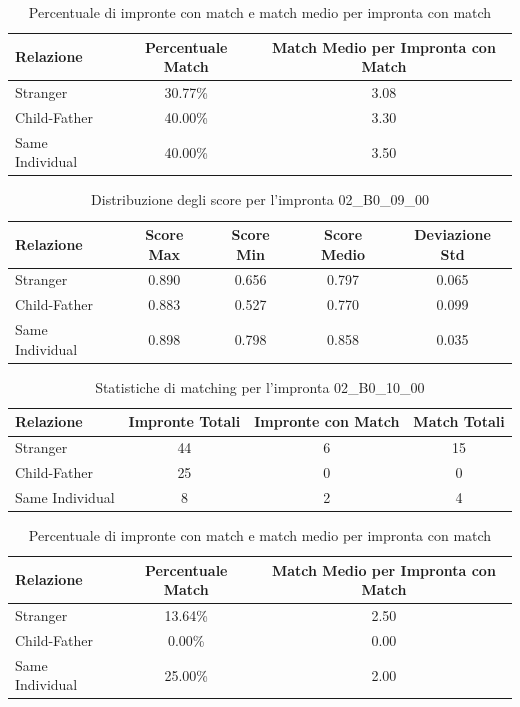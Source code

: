 \begin{table}[htbp]
\centering
\caption{Percentuale di impronte con match e match medio per impronta con match}
\label{tab:match_percentage_02_B0_09_00}
\begin{tabular}{|l|c|c|}
\hline
\textbf{Relazione} & \textbf{Percentuale Match} & \textbf{Match Medio per Impronta con Match} \\
\hline
Stranger & 30.77\% & 3.08 \\
\hline
Child-Father & 40.00\% & 3.30 \\
\hline
Same Individual & 40.00\% & 3.50 \\
\hline
\end{tabular}
\end{table}


\begin{table}[htbp]
\centering
\caption{Distribuzione degli score per l'impronta 02\_B0\_09\_00}
\label{tab:scores_02_B0_09_00}
\begin{tabular}{|l|c|c|c|c|}
\hline
\textbf{Relazione} & \textbf{Score Max} & \textbf{Score Min} & \textbf{Score Medio} & \textbf{Deviazione Std} \\
\hline
Stranger & 0.890 & 0.656 & 0.797 & 0.065 \\
\hline
Child-Father & 0.883 & 0.527 & 0.770 & 0.099 \\
\hline
Same Individual & 0.898 & 0.798 & 0.858 & 0.035 \\
\hline
\end{tabular}
\end{table}


\begin{table}[htbp]
\centering
\caption{Statistiche di matching per l'impronta 02\_B0\_10\_00}
\label{tab:results_02_B0_10_00}
\begin{tabular}{|l|c|c|c|}
\hline
\textbf{Relazione} & \textbf{Impronte Totali} & \textbf{Impronte con Match} & \textbf{Match Totali} \\
\hline
Stranger & 44 & 6 & 15 \\
\hline
Child-Father & 25 & 0 & 0 \\
\hline
Same Individual & 8 & 2 & 4 \\
\hline
\end{tabular}
\end{table}


\begin{table}[htbp]
\centering
\caption{Percentuale di impronte con match e match medio per impronta con match}
\label{tab:match_percentage_02_B0_10_00}
\begin{tabular}{|l|c|c|}
\hline
\textbf{Relazione} & \textbf{Percentuale Match} & \textbf{Match Medio per Impronta con Match} \\
\hline
Stranger & 13.64\% & 2.50 \\
\hline
Child-Father & 0.00\% & 0.00 \\
\hline
Same Individual & 25.00\% & 2.00 \\
\hline
\end{tabular}
\end{table}


